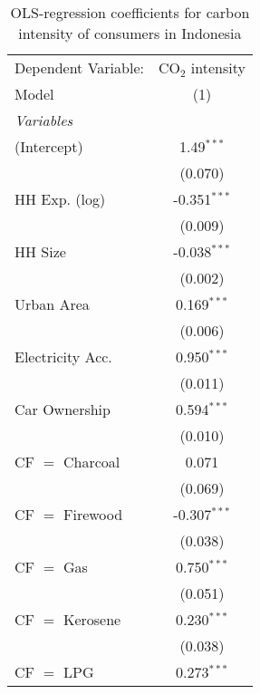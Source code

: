 
\begin{table}[htbp!]
   \centering
   \small
   \begin{adjustbox}{width = 1\textwidth, max height = 0.95\textheight, center}
      \begin{threeparttable}[b]
         \caption{\label{tab:OLS_1_IDN} OLS-regression coefficients for carbon intensity of consumers in Indonesia}
         \begin{tabular}{lc}
            \tabularnewline \midrule \midrule
            Dependent Variable: & CO$_{2}$ intensity\\  
            Model               & (1)\\  
            \midrule
            \emph{Variables}\\
            (Intercept)         & 1.49$^{***}$\\   
                                & (0.070)\\   
            HH Exp. (log)       & -0.351$^{***}$\\   
                                & (0.009)\\   
            HH Size             & -0.038$^{***}$\\   
                                & (0.002)\\   
            Urban Area          & 0.169$^{***}$\\   
                                & (0.006)\\   
            Electricity Acc.    & 0.950$^{***}$\\   
                                & (0.011)\\   
            Car Ownership       & 0.594$^{***}$\\   
                                & (0.010)\\   
            CF $=$ Charcoal     & 0.071\\   
                                & (0.069)\\   
            CF $=$ Firewood     & -0.307$^{***}$\\   
                                & (0.038)\\   
            CF $=$ Gas          & 0.750$^{***}$\\   
                                & (0.051)\\   
            CF $=$ Kerosene     & 0.230$^{***}$\\   
                                & (0.038)\\   
            CF $=$ LPG          & 0.273$^{***}$\\   

\end{tabular}
\end{threeparttable}
\end{adjustbox}
\end{table}
